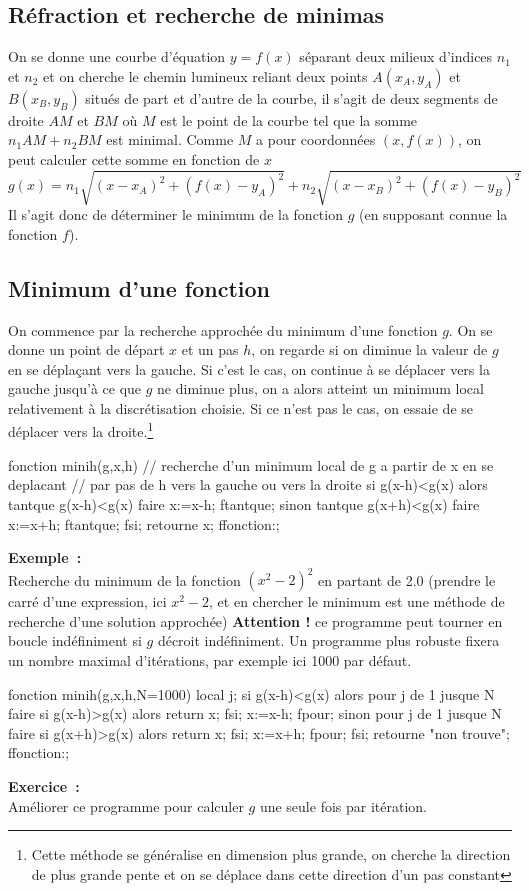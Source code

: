\documentclass[12pt,a4paper]{book}
\begin{document}
\begin{giacjshere}
\section{R\'efraction et recherche de minimas}
On se donne une courbe d'\'equation $y=f(x)$ 
s\'eparant deux milieux d'indices $n_1$ et
$n_2$ et on cherche le chemin lumineux reliant deux points $A(x_A,y_A)$
et $B(x_B,y_B)$ situ\'es de part et d'autre de la courbe, 
il s'agit de deux segments de droite $AM$ et $BM$ o\`u $M$
est le point de la courbe tel que la somme
$n_1AM+n_2BM$ est minimal. Comme $M$ a pour coordonn\'ees $(x,f(x))$,
on peut calculer cette somme en fonction de $x$
$$ g(x)=n_1\sqrt{(x-x_A)^2+(f(x)-y_A)^2}+n_2\sqrt{(x-x_B)^2+(f(x)-y_B)^2}$$
Il s'agit donc de d\'eterminer le minimum de la fonction $g$
(en supposant connue la fonction $f$).

\subsection{Minimum d'une fonction}
On commence par la recherche approch\'ee du minimum d'une fonction $g$.
On se donne un point de d\'epart $x$ et un pas $h$, on regarde si on
diminue la valeur de $g$ en se d\'epla\c{c}ant vers la gauche.
Si c'est le cas, on continue \`a se d\'eplacer vers la gauche
jusqu'\`a ce que $g$ ne diminue plus, on a alors atteint un
minimum local relativement \`a la discr\'etisation choisie.
Si ce n'est pas le cas, on essaie de se d\'eplacer vers la 
droite.\footnote{Cette m\'ethode se g\'en\'eralise en dimension plus grande,
on cherche la direction de plus grande pente et on se d\'eplace dans
cette direction d'un pas constant}
\begin{giaconload}
fonction minih(g,x,h) 
  // recherche d'un minimum local de g a partir de x en se deplacant
  // par pas de h vers la gauche ou vers la droite
  si g(x-h)<g(x) alors
    tantque g(x-h)<g(x) faire x:=x-h; ftantque;
  sinon
    tantque g(x+h)<g(x) faire x:=x+h; ftantque;
  fsi;
  retourne x;
ffonction:;
\end{giaconload}
{\bf Exemple~:}\\
 Recherche du minimum de la fonction $(x^2-2)^2$ en partant
de 2.0 (prendre le carr\'e d'une expression, ici $x^2-2$, et en chercher
le minimum est une m\'ethode de recherche d'une solution approch\'ee)
{\bf Attention !} ce programme peut tourner en boucle ind\'efiniment si $g$ 
d\'ecroit ind\'efiniment. Un programme plus robuste fixera un nombre
maximal d'it\'erations, par exemple ici 1000 par d\'efaut.
\begin{giacprog}
fonction minih(g,x,h,N=1000) 
  local j;
  si g(x-h)<g(x) alors
    pour j de 1 jusque N faire 
      si g(x-h)>g(x) alors return x; fsi;
      x:=x-h;
    fpour;
  sinon
    pour j de 1 jusque N faire 
      si g(x+h)>g(x) alors return x; fsi;
      x:=x+h;
    fpour;
  fsi;
  retourne "non trouve";
ffonction:;
\end{giacprog}
{\bf Exercice~:}\\
 Am\'eliorer ce programme pour calculer $g$ une seule
fois par it\'eration.


\end{giacjshere}
\end{document}
